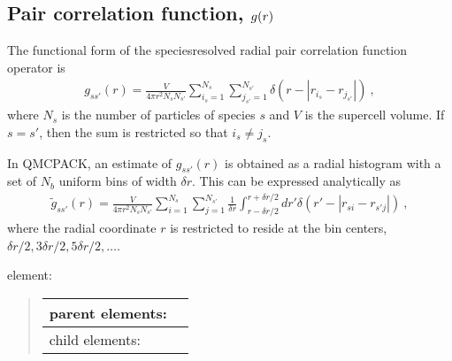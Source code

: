 \documentclass[letterpaper,10pt,english]{sphinxmanual}
\begin{document}
\subsection{Pair correlation function, \protect\(g(r)\protect\)}
\label{\detokenize{hamiltonianobservable:pair-correlation-function-g-r}}
The functional form of the species\sphinxhyphen{}resolved radial pair correlation function operator is
\begin{equation}\label{equation:hamiltonianobservable:eq34}
\begin{split}g_{ss'}(r) = \frac{V}{4\pi r^2N_sN_{s'}}\sum_{i_s=1}^{N_s}\sum_{j_{s'}=1}^{N_{s'}}\delta(r-|r_{i_s}-r_{j_{s'}}|)\:,\end{split}
\end{equation}
where \(N_s\) is the number of particles of species \(s\) and
\(V\) is the supercell volume. If \(s=s'\), then the sum is
restricted so that \(i_s\ne j_s\).

In QMCPACK, an estimate of \(g_{ss'}(r)\) is obtained as a radial
histogram with a set of \(N_b\) uniform bins of width
\(\delta r\). This can be expressed analytically as
\begin{equation}\label{equation:hamiltonianobservable:eq35}
\begin{split}\tilde{g}_{ss'}(r) = \frac{V}{4\pi r^2N_sN_{s'}}\sum_{i=1}^{N_s}\sum_{j=1}^{N_{s'}}\frac{1}{\delta r}\int_{r-\delta r/2}^{r+\delta r/2}dr'\delta(r'-|r_{si}-r_{s'j}|)\:,\end{split}
\end{equation}
where the radial coordinate \(r\) is restricted to reside at the bin
centers, \(\delta r/2, 3 \delta r/2, 5 \delta r/2, \ldots\).

 element:
\begin{quote}


\begin{savenotes}\sphinxattablestart
\centering
\begin{tabulary}{\linewidth}[t]{|T|T|}
\hline

parent elements:
&
\\
\hline
child elements:
&
\\
\hline
\end{tabulary}
\par
\sphinxattableend\end{savenotes}
\end{quote}
\end{document}
